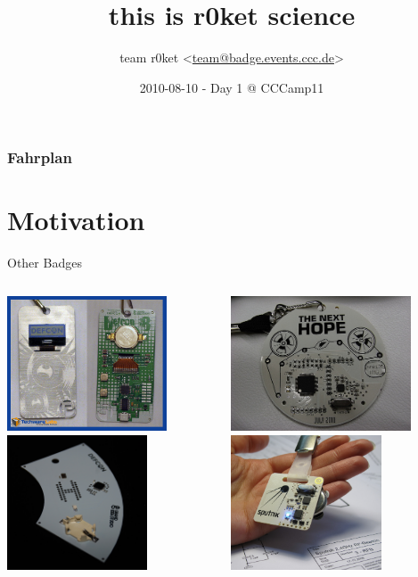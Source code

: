 \documentclass{beamer}
\title[r0ket]{\\
{\small this is r0ket science}
}
\author[team r0ket]
{team r0ket <\url{team@badge.events.ccc.de}>}
\institute[CCC]{}
\date{2010-08-10 - Day 1 @ CCCamp11}
\begin{document}
{
\begin{frame}
\thispagestyle{empty}
\titlepage
\end{frame}
}

\begin{frame}
\frametitle{Fahrplan}
\tableofcontents
\end{frame}

\setlength\fboxsep{5pt}
\setlength\fboxrule{0pt}

\section{Motivation}
  \begin{frame}{Other Badges}
  \begin{columns}
    \begin{column}{6cm}
        \includegraphics[height=4cm]{bilder/defcon1.jpg}\\
        \includegraphics[height=4cm]{bilder/defcon2.jpg}
    \end{column}
    \begin{column}{6cm}
        \includegraphics[height=4cm]{bilder/hope.jpg}\\
	\includegraphics[height=4cm]{bilder/sputnik.jpg}
    \end{column}
  \end{columns}
  \end{frame}
\end{document}
